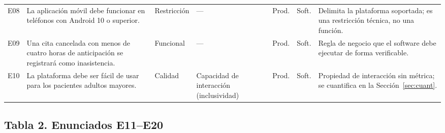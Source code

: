 \documentclass[11pt,a4paper]{article}
\begin{document}
\begin{longtable}{@{}p{0.85cm}p{4.35cm}p{1.8cm}p{2.45cm}p{1.15cm}p{1.15cm}p{3.3cm}@{}}
E08 & La aplicación móvil debe funcionar en teléfonos con Android 10 o superior. & Restricción & --- & Prod. & Soft. & Delimita la plataforma soportada; es una restricción técnica, no una función. \\
E09 & Una cita cancelada con menos de cuatro horas de anticipación se registrará como inasistencia. & Funcional & --- & Prod. & Soft. & Regla de negocio que el software debe ejecutar de forma verificable. \\
E10 & La plataforma debe ser fácil de usar para los pacientes adultos mayores. & Calidad & Capacidad de interacción (inclusividad) & Prod. & Soft. & Propiedad de interacción sin métrica; se cuantifica en la Sección~\ref{sec:cuant}. \\
\end{longtable}

\subsection*{Tabla 2. Enunciados E11--E20}
\end{document}
